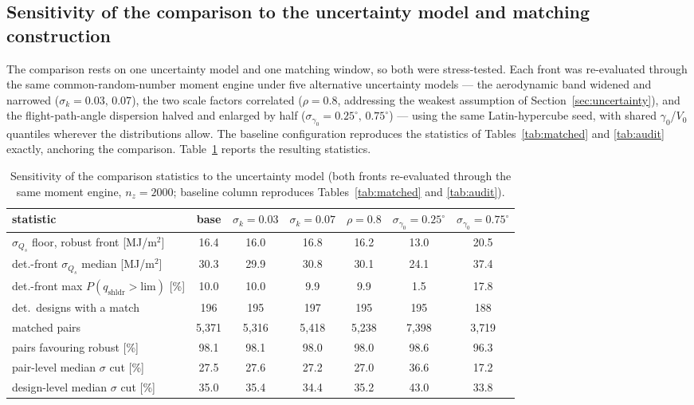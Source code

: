 \subsection{Sensitivity of the comparison to the uncertainty model and
matching construction}
\label{sec:sens}

The comparison rests on one uncertainty model and one matching window, so
both were stress-tested. Each front was re-evaluated through the same
common-random-number moment engine under five alternative uncertainty
models --- the aerodynamic band widened and narrowed
($\sigma_k=0.03,\,0.07$), the two scale factors correlated
($\rho=0.8$, addressing the weakest assumption of
Section~\ref{sec:uncertainty}), and the flight-path-angle dispersion
halved and enlarged by half ($\sigma_{\gamma_0}=0.25^\circ,\,0.75^\circ$)
--- using the same Latin-hypercube seed, with shared $\gamma_0$/$V_0$
quantiles wherever the distributions allow. The baseline configuration
reproduces the statistics of Tables~\ref{tab:matched} and \ref{tab:audit}
exactly, anchoring the comparison. Table~\ref{tab:sens} reports the
resulting statistics.

\begin{table}[htbp]
\centering
\caption{Sensitivity of the comparison statistics to the uncertainty
  model (both fronts re-evaluated through the same moment engine,
  $n_z=2000$; baseline column reproduces Tables~\ref{tab:matched} and
  \ref{tab:audit}).}
\label{tab:sens}
\begin{tabular}{lcccccc}
\toprule
statistic & base & $\sigma_k{=}0.03$ & $\sigma_k{=}0.07$ &
$\rho{=}0.8$ & $\sigma_{\gamma_0}{=}0.25^\circ$ &
$\sigma_{\gamma_0}{=}0.75^\circ$ \\
\midrule
$\sigma_{Q_s}$ floor, robust front [MJ/m$^2$]
  & 16.4 & 16.0 & 16.8 & 16.2 & 13.0 & 20.5 \\
det.-front $\sigma_{Q_s}$ median [MJ/m$^2$]
  & 30.3 & 29.9 & 30.8 & 30.1 & 24.1 & 37.4 \\
det.-front max $P(q_{\mathrm{shldr}}>\mathrm{lim})$ [\%]
  & 10.0 & 10.0 & 9.9 & 9.9 & 1.5 & 17.8 \\
det.\ designs with a match
  & 196 & 195 & 197 & 195 & 195 & 188 \\
matched pairs
  & 5{,}371 & 5{,}316 & 5{,}418 & 5{,}238 & 7{,}398 & 3{,}719 \\
pairs favouring robust [\%]
  & 98.1 & 98.1 & 98.0 & 98.0 & 98.6 & 96.3 \\
pair-level median $\sigma$ cut [\%]
  & 27.5 & 27.6 & 27.2 & 27.0 & 36.6 & 17.2 \\
design-level median $\sigma$ cut [\%]
  & 35.0 & 35.4 & 34.4 & 35.2 & 43.0 & 33.8 \\
\bottomrule
\end{tabular}
\end{table}

